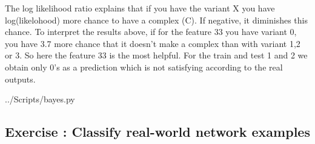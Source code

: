 \documentclass[10pt,a4paper]{article}
\newcommand{\exercise}[1]
{
  \stepcounter{subsection}
  \subsection*{Exercise \thesubsection: #1}

}
\begin{document}
\begin{enumerate}
The log likelihood ratio explains that if you have the variant X you have log(likelohood) more chance to have a complex (C). If negative, it diminishes this chance. To interpret the results above, if for the feature 33 you have variant 0, you have 3.7 more chance that it doesn't make a complex than with variant 1,2 or 3. So here the feature 33 is the most helpful. For the train and test 1 and 2 we obtain only 0's as a prediction which is not satisfying according to the real outputs. %

 {../Scripts/bayes.py}


\end{enumerate}


\newpage
\exercise{Classify real-world network examples}
\end{document}
